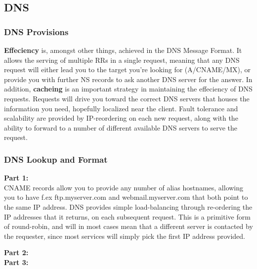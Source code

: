 \subsection{DNS}
\subsubsection{DNS Provisions}
\textbf{Effeciency} is, amongst other things, achieved in the DNS Message Format. It allows the serving of multiple RRs 
in a single request, meaning that any DNS request will either lead you to the target you're looking for (A/CNAME/MX), or
provide you with further NS records to ask another DNS server for the answer. In addition, \textbf{cacheing} is an important
strategy in maintaining the effeciency of DNS requests. Requests will drive you toward the correct DNS servers that
houses the information you need, hopefully localized near the client. Fault tolerance and scalability are provided by IP-reordering
on each new request, along with the ability to forward to a number of different available DNS servers to serve the request.

\subsubsection{DNS Lookup and Format}
\textbf{Part 1:}\\
CNAME records allow you to provide any number of alias hostnames, allowing you to have f.ex ftp.myserver.com and webmail.myserver.com
that both point to the same IP address. DNS provides simple load-balancing through re-ordering the IP addresses that it returns, on each
subsequent request. This is a primitive form of round-robin, and will in most cases mean that a different server is contacted by the requester,
since most services will simply pick the first IP address provided. 

\noindent \textbf{Part 2:}\\

\noindent \textbf{Part 3:}\\


\subsubsection{}